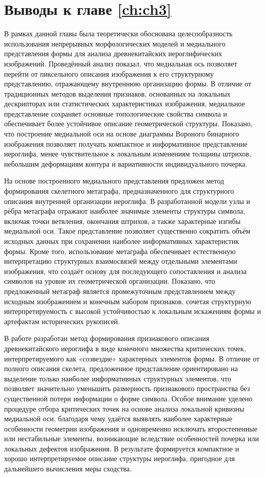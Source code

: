 \section{Выводы к главе \cref{ch:ch3}}

В рамках данной главы была теоретически обоснована целесообразность использования непрерывных морфологических моделей и медиального представления формы для анализа древнекитайских иероглифических изображений. Проведённый анализ показал, что медиальная ось позволяет перейти от пиксельного описания изображения к его структурному представлению, отражающему внутреннюю организацию формы. В отличие от традиционных методов выделения признаков, основанных на локальных дескрипторах или статистических характеристиках изображения, медиальное представление сохраняет основные топологические свойства символа и обеспечивает более устойчивое описание геометрической структуры. Показано, что построение медиальной оси на основе диаграммы Вороного бинарного изображения позволяет получать компактное и информативное представление иероглифа, менее чувствительное к локальным изменениям толщины штрихов, небольшим деформациям контура и вариативности индивидуального почерка.

На основе построенного медиального представления предложен метод формирования скелетного метаграфа, предназначенного для структурного описания внутренней организации иероглифа. В разработанной модели узлы и рёбра метаграфа отражают наиболее значимые элементы структуры символа, включая точки ветвления, окончания штрихов, а также характерные изгибы медиальной оси. Такое представление позволяет существенно сократить объём исходных данных при сохранении наиболее информативных характеристик формы. Кроме того, использование метаграфа обеспечивает естественную интерпретацию структурных взаимосвязей между отдельными элементами изображения, что создаёт основу для последующего сопоставления и анализа символов на уровне их геометрической организации. Показано, что предложенный метаграф является промежуточным представлением между исходным изображением и конечным набором признаков, сочетая структурную интерпретируемость с высокой устойчивостью к локальным искажениям формы и артефактам исторических рукописей.

В работе разработан метод формирования признакового описания древнекитайского иероглифа в виде конечного множества критических точек, интерпретируемого как «созвездие» характерных элементов формы. В отличие от полного описания скелета, предложенное представление ориентировано на выделение только наиболее информативных структурных элементов, что позволяет значительно уменьшить размерность признакового пространства без существенной потери информации о форме символа. Особое внимание уделено процедуре отбора критических точек на основе анализа локальной кривизны медиальной оси, благодаря чему удаётся выявлять наиболее характерные особенности геометрии изображения и одновременно исключать второстепенные или нестабильные элементы, возникающие вследствие особенностей почерка или локальных дефектов изображения. В результате формируется компактное и хорошо интерпретируемое описание структуры иероглифа, пригодное для дальнейшего вычисления меры сходства.

